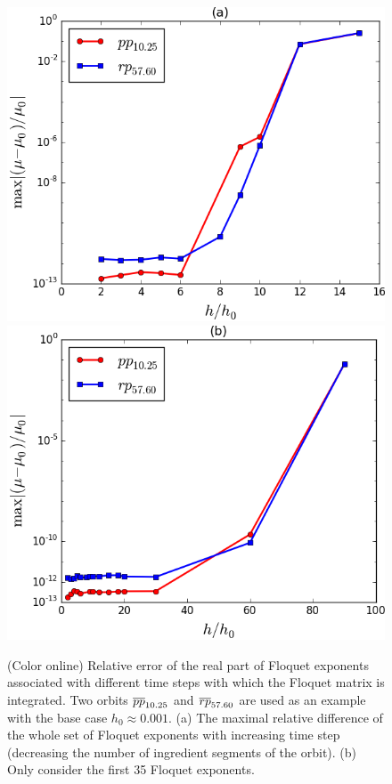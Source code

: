 \documentclass[final,leqno,onefignum,onetabnum]{siamltexmm}
\begin{document}
\begin{figure}[h]
  \centering
  \includegraphics[width=0.47\linewidth]{ppo1FEerror} \hfill
  \includegraphics[width=0.47\linewidth]{rpo22FEerror}
  \caption{(Color online) Relative error of the real part of
    Floquet exponents associated with different time steps
    with which the Floquet matrix is integrated. Two orbits ${\overline{pp}}_{10.25}$
    and ${\overline{rp}}_{57.60}$ are used as an example with the base
    case $h_0 \approx 0.001$. (a) The maximal relative difference of
    the whole set of Floquet exponents with increasing time step (decreasing
    the number of ingredient segments of the orbit). (b) Only consider
    the first 35 Floquet exponents.}
  \label{fig:FEerror}
\end{figure}
\end{document}
